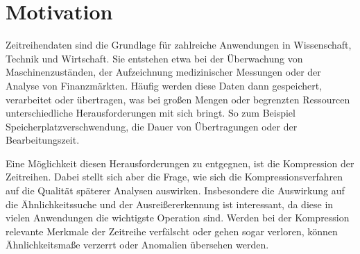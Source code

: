 \section{Motivation}

Zeitreihendaten sind die Grundlage für zahlreiche Anwendungen in Wissenschaft, Technik und Wirtschaft. Sie entstehen etwa bei der Überwachung von Maschinenzuständen, der Aufzeichnung medizinischer Messungen oder der Analyse von Finanzmärkten. Häufig werden diese Daten dann gespeichert, verarbeitet oder übertragen, was bei großen Mengen oder begrenzten Ressourcen unterschiedliche Herausforderungen mit sich bringt. So zum Beispiel Speicherplatzverschwendung, die Dauer von Übertragungen oder der Bearbeitungszeit.

Eine Möglichkeit diesen Herausforderungen zu entgegnen, ist die Kompression der Zeitreihen. Dabei stellt sich aber die Frage, wie sich die Kompressionsverfahren auf die Qualität späterer Analysen auswirken. Insbesondere die Auswirkung auf die Ähnlichkeitssuche und der Ausreißererkennung ist interessant, da diese in vielen Anwendungen die wichtigste Operation sind. Werden bei der Kompression relevante Merkmale der Zeitreihe verfälscht oder gehen sogar verloren, können Ähnlichkeitsmaße verzerrt oder Anomalien übersehen werden.

